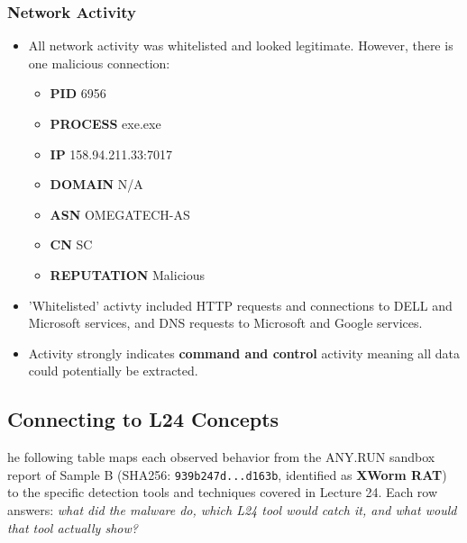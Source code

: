 \documentclass[10pt]{article}
\begin{document}
\subsubsection{Network Activity}
\begin{itemize}
	\item All network activity was whitelisted and looked legitimate. However, there is one malicious connection:
	\begin{itemize}
		\item \scriptsize{\textbf{PID} 6956}
		\item \scriptsize{\textbf{PROCESS} exe.exe}
		\item \scriptsize{\textbf{IP} 158.94.211.33:7017}
		\item \scriptsize{\textbf{DOMAIN} N/A}
		\item \scriptsize{\textbf{ASN} OMEGATECH-AS}
		\item \scriptsize{\textbf{CN} SC}
		\item \scriptsize{\textbf{REPUTATION} Malicious}
	\end{itemize}
	\item 'Whitelisted' activty included HTTP requests and connections to DELL and Microsoft services, and DNS requests to 
	Microsoft and Google services.
	\item Activity strongly indicates \textbf{command and control} activity meaning all data could potentially be extracted.
\end{itemize}
\subsection{Connecting to L24 Concepts}
he following table maps each observed behavior from the ANY.RUN sandbox report of
Sample B (SHA256: \texttt{939b247d...d163b}, identified as \textbf{XWorm RAT}) to
the specific detection tools and techniques covered in Lecture 24.
Each row answers: \emph{what did the malware do, which L24 tool would catch it, and
what would that tool actually show?}
 
\vspace{1em}
 
\end{document}
